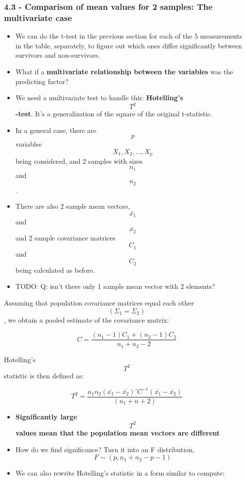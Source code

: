 \hypertarget{comparison-of-mean-values-for-2-samples-the-multivariate-case}{%
\subsubsection{4.3 - Comparison of mean values for 2 samples: The
multivariate
case}\label{comparison-of-mean-values-for-2-samples-the-multivariate-case}}

\begin{itemize}
\tightlist
\item
  We can do the t-test in the previous section for each of the 5
  measurements in the table, separately, to figure out which ones differ
  significantly between survivors and non-survivors.
\item
  What if a \textbf{multivariate relationship between the variables} was
  the predicting factor?
\item
  We need a multivariate test to handle this: \textbf{Hotelling's}
  \[T^2\]\textbf{-test}. It's a generalization of the square of the
  original t-statistic.
\item
  In a general case, there are \[p\] variables \[X_1, X_2, ..., X_p\]
  being considered, and 2 samples with sizes \[n_1\] and \[n_2\].
\item
  There are also 2 sample mean vectors, \[\bar{x_1}\] and \[\bar{x_2}\]
  and 2 sample covariance matrices \[C_1\] and \[C_2\] being calculated
  as before.
\item
  TODO: Q: isn't there only 1 sample mean vector with 2 elements?
\end{itemize}

Assuming that population covariance matrices equal each other
\[(\Sigma_1 = \Sigma_2)\], we obtain a pooled estimate of the covariance
matrix:

\[C = \frac{(n_1 - 1)C_1 + (n_2 - 1)C_2}{n_1 + n_2 - 2}\]

Hotelling's \[T^2\] statistic is then defined as:

\[T^2 = \frac{n_1 n_2(\bar{x_1} - \bar{x_2})'C^{-1}(\bar{x_1} - \bar{x_2})} {(n_1 + n+2)}\]

\begin{itemize}
\tightlist
\item
  \textbf{Significantly large} \[T^2\] \textbf{values mean that the
  population mean vectors are different}
\item
  How do we find significance? Turn it into an F distribution,
  \[F \sim (p, n_1 + n_2 - p - 1)\]
\item
  We can also rewrite Hotelling's statistic in a form similar to
  compute:
\end{itemize}

